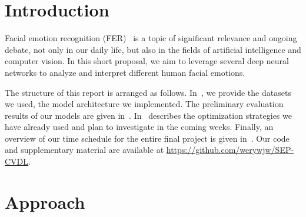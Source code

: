\section{Introduction}
\label{sec:intro}

Facial emotion recognition (FER)~\cite{Ko18} is a topic of significant relevance and ongoing debate, not only in our daily life, but also in the fields of artificial intelligence and computer vision.
In this short proposal, we aim to leverage several deep neural networks to analyze and interpret different human facial emotions. 

The structure of this report is arranged as follows. 
In~, 
we provide the datasets we used, 
the model architecture we implemented. 
The preliminary evaluation results of our models are given in~. 
In~ describes the optimization strategies we have already used and plan to investigate in the coming weeks. 
Finally,
an overview of our time schedule for the entire final project is given in~. 
Our code and supplementary material are available at \url{https://github.com/werywjw/SEP-CVDL}.




\section{Approach}
\label{sec:approach}

